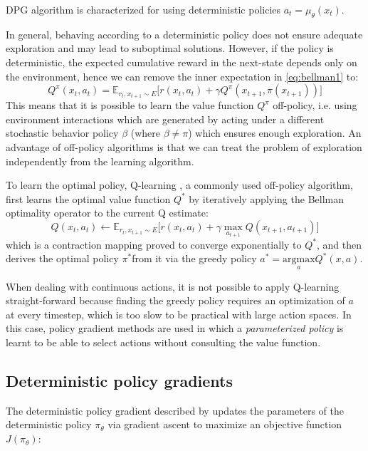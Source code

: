 DPG algorithm \citep{silver2014b} is characterized for using deterministic policies $a_t=\mu_{\theta}(x_t)$.

In general, behaving according to a deterministic policy does not ensure adequate exploration
and may lead to suboptimal solutions. 
However, if the policy is deterministic, the expected cumulative reward in the next-state 
depends only on the environment, hence we can remove the inner expectation in \ref{eq:bellman1} to:
\begin{equation}
    Q^\pi(x_t,a_t) = \mathbb E_{r_t,x_{t+1} \sim E}\Big[ r(x_t,a_t) + \gamma Q^\pi(x_{t+1},\pi(x_{t+1}))\Big]
\end{equation}
\label{par:offpolicy}This means that it is possible to learn the value function
$Q^\pi$ off-policy, i.e. using environment interactions which are generated by acting under a different stochastic
behavior policy $\beta$ (where $\beta \neq \pi$) which ensures enough exploration.
An advantage of off-policy algorithms is that we can treat the problem of exploration
independently from the learning algorithm.

To learn the optimal policy, Q-learning \cite{Watkins1992}, a commonly used off-policy algorithm, first learns the optimal 
value function $Q^*$ by iteratively applying the Bellman optimality operator to the current Q estimate:
\begin{equation}
    Q(x_t,a_t) \leftarrow \mathbb E_{r_t,x_{t+1} \sim E}\Big[ r(x_t,a_t) + \gamma \underset{a_{t+1}} \max Q(x_{t+1},a_{t+1})\Big]
\end{equation}
which is a contraction mapping proved to converge exponentially to $Q^*$, and then
derives the optimal policy $\pi^*$from it via the greedy policy $a^*=\underset{a}{\text{argmax}} Q^*(x,a)$.

When dealing with continuous actions, it is not possible to apply Q-learning
straight-forward because finding the greedy policy requires an optimization of $a$ at 
every timestep, which is too slow to be practical with large action spaces.
In this case, policy gradient methods are used in which a \textit{parameterized policy} is learnt 
to be able to select actions without consulting the value function.


\subsection{Deterministic policy gradients}
The deterministic policy gradient described by \citet{silver2014b} updates the parameters of the
deterministic policy $\pi_\theta$ via gradient ascent to maximize an objective function $J(\pi_\theta)$:

